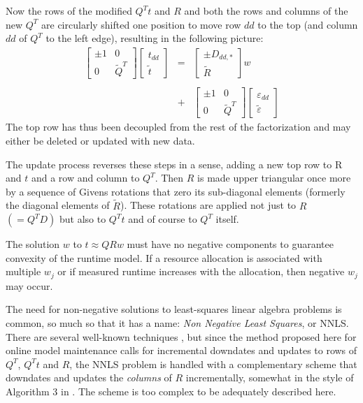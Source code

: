 Now the rows of the modified $Q^Tt$ and $R$ and both the rows and columns of the new $Q^T$
are circularly shifted one position to move row $dd$ to the top (and column $dd$ of $Q^T$ to the left edge),
resulting in the following picture:
\begin{displaymath}
\begin{array}{lll}
    \left[\begin{array}{cc}
      \pm1  &  0 \\
      0     &  \tilde{Q}^T
   \end{array}\right]
   \left[\begin{array}{c}
      t_{dd} \\
      \tilde{t}
   \end{array}\right]
   &=&
   \left[\begin{array}{c}
      \pm D_{dd,*} \\
      \tilde{R}
   \end{array}\right] w
   \\
   \\
   &+&
   \left[\begin{array}{cc}
      \pm1  &  0 \\
      0     &  \tilde{Q}^T
   \end{array}\right]
   \left[\begin{array}{c}
      \varepsilon_{dd} \\
      \tilde{\varepsilon}
   \end{array}\right]
\end{array}
\end{displaymath}
The top row has thus been decoupled from the rest of the factorization and may either be deleted or updated with new data.

The update process reverses these steps in a sense, adding a new top row to R and $t$ and a row and column to $Q^T$.
Then $R$ is made upper triangular once more by a sequence of Givens rotations that zero its sub-diagonal elements
(formerly the diagonal elements of $\tilde{R}$).
These rotations are applied not just to $R$ $(= Q^T D)$ but also to $Q^Tt$ and of course to $Q^T$ itself.

The solution $w$ to $t \approx QRw$ must have no negative components to guarantee convexity of the runtime model.
If a resource allocation is associated with multiple $w_j$
or if measured runtime increases with the allocation,
then negative $w_j$ may occur.

The need for non-negative solutions to least-squares linear algebra problems is common,
so much so that it has a name: \emph{Non Negative Least Squares}, or NNLS.
There are several well-known techniques \cite{LD},
but since the method proposed here for online model maintenance calls for
incremental downdates and updates to rows of $Q^T$, $Q^Tt$ and $R$,
the NNLS problem is handled with a complementary scheme that
downdates and updates the \emph{columns} of $R$ incrementally,
somewhat in the style of Algorithm 3 in \cite{DL}.
The scheme is too complex to be adequately described here.

